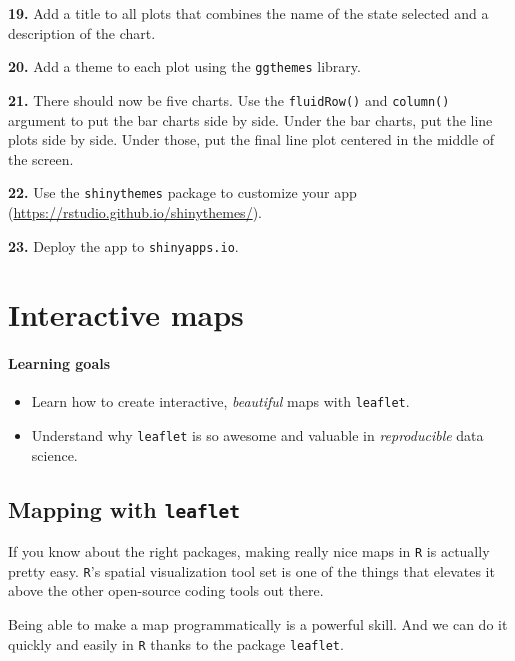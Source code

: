 \documentclass[]{book}
\begin{document}
\textbf{19.} Add a title to all plots that combines the name of the state selected and a description of the chart.

\textbf{20.} Add a theme to each plot using the \texttt{ggthemes} library.

\textbf{21.} There should now be five charts. Use the \texttt{fluidRow()} and \texttt{column()} argument to put the bar charts side by side. Under the bar charts, put the line plots side by side. Under those, put the final line plot centered in the middle of the screen.

\textbf{22.} Use the \texttt{shinythemes} package to customize your app (\url{https://rstudio.github.io/shinythemes/}).

\textbf{23.} Deploy the app to \texttt{shinyapps.io}.

\hypertarget{interactive-maps}{%
\chapter{Interactive maps}\label{interactive-maps}}

\hypertarget{learning-goals-17}{%
\subsubsection*{Learning goals}\label{learning-goals-17}}

\begin{itemize}
\item
  Learn how to create interactive, \emph{beautiful} maps with \texttt{leaflet}.
\item
  Understand why \texttt{leaflet} is so awesome and valuable in \emph{reproducible} data science.
\end{itemize}

\hypertarget{mapping-with-leaflet}{%
\section*{\texorpdfstring{Mapping with \texttt{leaflet}}{Mapping with leaflet}}\label{mapping-with-leaflet}}

If you know about the right packages, making really nice maps in \texttt{R} is actually pretty easy. \texttt{R}'s spatial visualization tool set is one of the things that elevates it above the other open-source coding tools out there.

Being able to make a map programmatically is a powerful skill. And we can do it quickly and easily in \texttt{R} thanks to the package \texttt{leaflet}.
\end{document}
